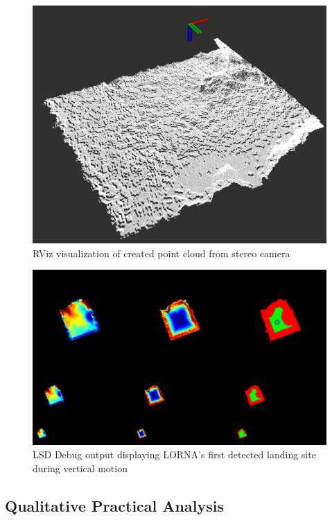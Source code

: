 \begin{figure}
    \centering
    \includegraphics[scale=0.45]{images/preparation/stereo/stereo_pointcloud.png}
    \caption{RViz visualization of created point cloud from stereo camera}
\end{figure}
\clearpage %

\begin{figure}
    \centering
    \includegraphics[scale=0.25]{images/preparation/stereo/lsd_ascent.png}
    \caption{LSD Debug output displaying LORNA's first detected landing site during vertical motion}
\end{figure}

\subsection{Qualitative Practical Analysis}


